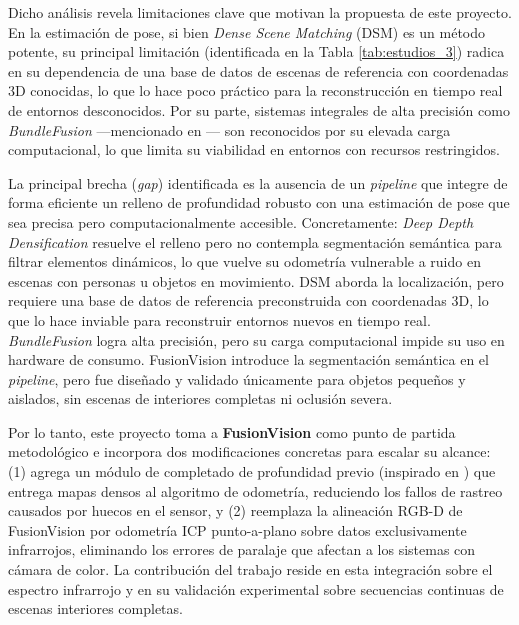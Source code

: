 \documentclass[12pt, a4, twoside, openany]{report}
\begin{document}
Dicho análisis revela limitaciones clave que motivan la propuesta de este proyecto. En la estimación de pose, si bien \textit{Dense Scene Matching} (DSM) \cite{tang2021learning} es un método potente, su principal limitación (identificada en la Tabla \ref{tab:estudios_3}) radica en su dependencia de una base de datos de escenas de referencia con coordenadas 3D conocidas, lo que lo hace poco práctico para la reconstrucción en tiempo real de entornos desconocidos. Por su parte, sistemas integrales de alta precisión como \textit{BundleFusion} \cite{10.1145/3072959.3054739} —mencionado en \cite{li2022high}— son reconocidos por su elevada carga computacional, lo que limita su viabilidad en entornos con recursos restringidos.

La principal brecha (\textit{gap}) identificada es la ausencia de un \textit{pipeline} que integre de forma eficiente un relleno de profundidad robusto con una estimación de pose que sea precisa pero computacionalmente accesible. Concretamente: \textit{Deep Depth Densification} \cite{chen2018estimating} resuelve el relleno pero no contempla segmentación semántica para filtrar elementos dinámicos, lo que vuelve su odometría vulnerable a ruido en escenas con personas u objetos en movimiento. DSM \cite{tang2021learning} aborda la localización, pero requiere una base de datos de referencia preconstruida con coordenadas 3D, lo que lo hace inviable para reconstruir entornos nuevos en tiempo real. \textit{BundleFusion} \cite{10.1145/3072959.3054739} logra alta precisión, pero su carga computacional impide su uso en hardware de consumo. FusionVision \cite{el2024fusionvision} introduce la segmentación semántica en el \textit{pipeline}, pero fue diseñado y validado únicamente para objetos pequeños y aislados, sin escenas de interiores completas ni oclusión severa.

Por lo tanto, este proyecto toma a \textbf{FusionVision} \cite{el2024fusionvision} como punto de partida metodológico e incorpora dos modificaciones concretas para escalar su alcance: (1) agrega un módulo de completado de profundidad previo (inspirado en \cite{chen2018estimating}) que entrega mapas densos al algoritmo de odometría, reduciendo los fallos de rastreo causados por huecos en el sensor, y (2) reemplaza la alineación RGB-D de FusionVision por odometría ICP punto-a-plano sobre datos exclusivamente infrarrojos, eliminando los errores de paralaje que afectan a los sistemas con cámara de color. La contribución del trabajo reside en esta integración sobre el espectro infrarrojo y en su validación experimental sobre secuencias continuas de escenas interiores completas.
\end{document}
